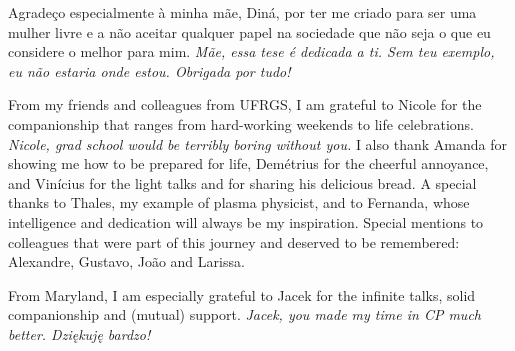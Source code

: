 Agradeço especialmente à minha mãe, Diná, por ter me criado para ser uma
mulher livre e a não aceitar qualquer papel na sociedade que não seja o
que eu considere o melhor para mim. \emph{Mãe, essa tese é dedicada a ti.
  Sem teu exemplo, eu não estaria onde estou. Obrigada por tudo!}

From my friends and colleagues from UFRGS, I am grateful to Nicole for the
companionship that ranges from hard-working weekends to life celebrations.
\emph{Nicole, grad school would be terribly boring without you.} I also thank
Amanda for showing me how to be prepared for life, Demétrius for the cheerful
annoyance, and Vinícius for the light talks and for sharing his delicious
bread. A special thanks to Thales, my example of plasma physicist, and to
Fernanda, whose intelligence and dedication will always be my inspiration. 
Special mentions to colleagues that were part of this journey and deserved
to be remembered: Alexandre, Gustavo, João and Larissa.

From Maryland, I am especially grateful to Jacek for the infinite talks, solid
companionship and (mutual) support.\emph{ Jacek, you made my time in CP much
  better. Dziękuję bardzo!}






  
  
  



